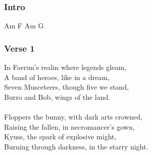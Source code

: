 \documentclass[letterpaper,openany,oneside,twocolumn]{book}
\newcommand{\PATH}{../../}
\begin{document}




\newcommand{\chord}[1]{\colorbox{gray!60}{\footnotesize{#1}}}
\clearpage
{}
\subsubsection*{Intro}
\chord{Am} \chord{F} \chord {Am} \chord{G}

\subsubsection*{Verse 1}
{\entryfont In Faerun's realm where legends gleam,}\\
A band of heroes, like in a dream,\\
Seven Musceteers, though five we stand,\\
Burro and Bob, wings of the land.\\
\\
Floppers the bunny, with dark arts crowned,\\
Raising the fallen, in necromancer's gown,\\
Kyuss, the spark of explosive might,\\
Burning through darkness, in the starry night.
\end{document}
